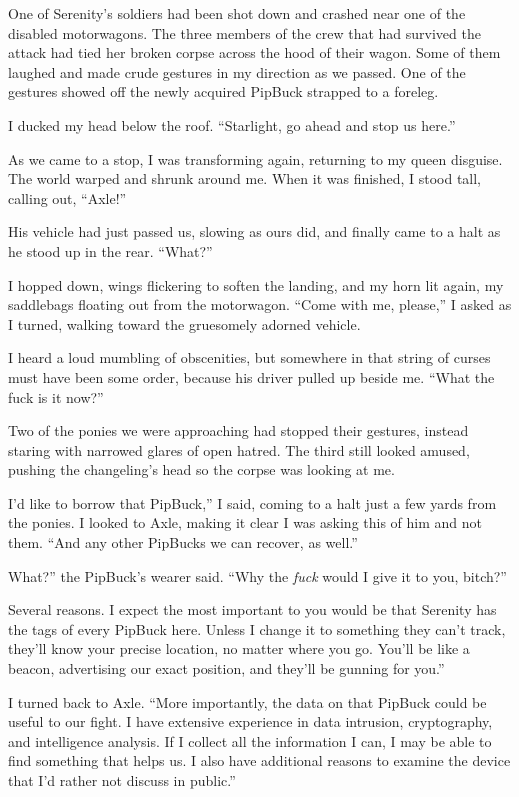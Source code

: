 One of Serenity’s soldiers had been shot down and crashed near one of the disabled motorwagons. The three members of the crew that had survived the attack had tied her broken corpse across the hood of their wagon. Some of them laughed and made crude gestures in my direction as we passed. One of the gestures showed off the newly acquired PipBuck strapped to a foreleg.

I ducked my head below the roof. “Starlight, go ahead and stop us here.”

As we came to a stop, I was transforming again, returning to my queen disguise. The world warped and shrunk around me. When it was finished, I stood tall, calling out, “Axle!”

His vehicle had just passed us, slowing as ours did, and finally came to a halt as he stood up in the rear. “What?”

I hopped down, wings flickering to soften the landing, and my horn lit again, my saddlebags floating out from the motorwagon. “Come with me, please,” I asked as I turned, walking toward the gruesomely adorned vehicle.

I heard a loud mumbling of obscenities, but somewhere in that string of curses must have been some order, because his driver pulled up beside me. “What the fuck is it now?”

Two of the ponies we were approaching had stopped their gestures, instead staring with narrowed glares of open hatred. The third still looked amused, pushing the changeling’s head so the corpse was looking at me.

\leavevmode{}I’d like to borrow that PipBuck,” I said, coming to a halt just a few yards from the ponies. I looked to Axle, making it clear I was asking this of him and not them. “And any other PipBucks we can recover, as well.”

\leavevmode{}What?” the PipBuck’s wearer said. “Why the \textit{fuck} would I give it to you, bitch?”

\leavevmode{}Several reasons. I expect the most important to you would be that Serenity has the tags of every PipBuck here. Unless I change it to something they can’t track, they’ll know your precise location, no matter where you go. You’ll be like a beacon, advertising our exact position, and they’ll be gunning for you.”

I turned back to Axle. “More importantly, the data on that PipBuck could be useful to our fight. I have extensive experience in data intrusion, cryptography, and intelligence analysis. If I collect all the information I can, I may be able to find something that helps us. I also have additional reasons to examine the device that I’d rather not discuss in public.”


